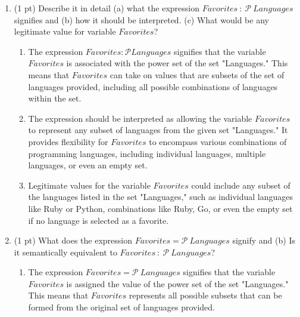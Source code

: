 \documentclass[12pt]{article}
\begin{document}
\begin{spacing}{1.5}
\begin{enumerate}
		\item (1 pt) Describe it in detail (a) what the expression $Favorites\: : \: \mathcal{P} \: Languages$ signifies and (b) how it should be interpreted. (c) What would be any legitimate value for variable $Favorites$?
		      		      		      		      
		      \begin{enumerate}
		      	\item The expression $Favorites : \mathcal{P} Languages$ signifies that the variable $Favorites$ is associated with the power set of the set "Languages." This means that $Favorites$ can take on values that are subsets of the set of languages provided, including all possible combinations of languages within the set. 
		      	      		      	      		      	      		      	                      
		      	\item The expression should be interpreted as allowing the variable $Favorites$ to represent any subset of languages from the given set "Languages." It provides flexibility for $Favorites$ to encompass various combinations of programming languages, including individual languages, multiple languages, or even an empty set. 
		      	      		      	      		      	      		      	                      
		      	\item Legitimate values for the variable $Favorites$ could include any subset of the languages listed in the set "Languages," such as individual languages like Ruby or Python, combinations like {Ruby, Go}, or even the empty set if no language is selected as a favorite.
		      \end{enumerate}
		      		      		      		      
		\item (1 pt) What does the expression $Favorites = \mathcal{P} \: Languages$ signify and (b) Is it semantically equivalent to $Favorites \: : \: \mathcal{P} \: Languages$?
		      		      		      		      
		      \begin{enumerate}
		      	\item The expression $Favorites = \mathcal{P} \: Languages$ signifies that the variable $Favorites$ is assigned the value of the power set of the set "Languages." This means that $Favorites$ represents all possible subsets that can be formed from the original set of languages provided. 
		      	      		      	      		      	      		      	                      

\end{enumerate}
\end{enumerate}
\end{spacing}
\end{document}
